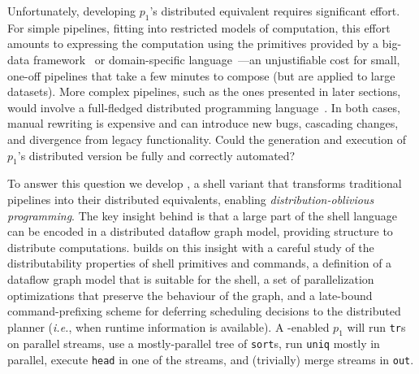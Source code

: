 \documentclass[sigplan,10pt,review,anonymous]{acmart}
\newcommand{\eg}{{\em e.g.}, }
\newcommand{\ie}{{\em i.e.}, }
\newcommand{\ttt}[1]{\texttt{\small #1}}
\newcommand{\kk}[1]{[{\color{magenta}#1 --- kk}]}
\begin{document}
Unfortunately, developing $p_1$'s distributed equivalent requires significant effort.
For simple pipelines, fitting into restricted models of computation, this effort amounts to expressing the computation using the primitives provided by a big-data framework~\cite{mapreduce:08, ciel:11, spark:12, naiad:13} or domain-specific language~\cite{alvaro2011consistency, distal:13, meiklejohn2015lasp}---an unjustifiable cost for small, one-off pipelines that take a few minutes to compose (but are applied to large datasets).
More complex pipelines, such as the ones presented in later sections, would involve a full-fledged distributed programming language~\cite{erlang:96, lopes1997d, acute:05, mace:07, cloudhaskell:11, ScalaLoci:18}. %
In both cases, manual rewriting is expensive and can introduce new bugs, cascading changes, and divergence from legacy functionality.
Could the generation and execution of $p_1$'s distributed version be fully and correctly automated?

To answer this question we develop \sys, a shell variant that transforms traditional \unix pipelines into their distributed equivalents, enabling \emph{distribution-oblivious programming}.
The key insight behind \sys is that a large part of the shell language can be encoded in a distributed dataflow graph model, providing structure to distribute computations.
\sys builds on this insight with a careful study of the distributability properties of shell primitives and commands, a definition of a dataflow graph model that is suitable for the shell, a set of parallelization optimizations that preserve the behaviour of the graph, and a late-bound command-prefixing scheme for deferring scheduling decisions to the distributed planner (\ie when runtime information is available).
A \sys-enabled $p_1$ will run \ttt{tr}s on parallel streams,
  use a mostly-parallel tree of \ttt{sort}s,
  run \ttt{uniq} mostly in parallel,
  execute \ttt{head} in one of the streams,
  and (trivially) merge streams in \ttt{out}.
\end{document}
